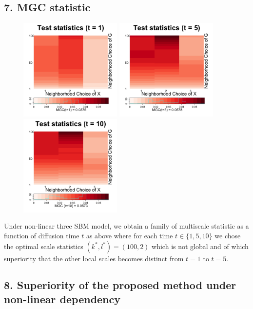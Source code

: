 \documentclass[12pt]{article}
\begin{document}
\subsection*{7. MGC statistic}
\begin{figure}[H]
	\centering
	\includegraphics[width=2in]{../Figure/ThreeSBM_stat1.png}
	\includegraphics[width=2in]{../Figure/ThreeSBM_stat5.png}
	\includegraphics[width=2in]{../Figure/ThreeSBM_stat10.png}
	\label{fig:ThreeSBM_stat}
\end{figure}

Under non-linear three SBM model, we obtain a family of multiscale statistic as a function of diffusion time $t$ as above where for each time $t \in \{ 1,5, 10 \}$ we chose the optimal scale statistics $(k^{*}, l^{*}) = (100, 2)$ which is not global and of which superiority that the other local scales becomes distinct from $t=1$ to $t=5$. 


\subsection*{8. Superiority of the proposed method under non-linear dependency}
\end{document}
